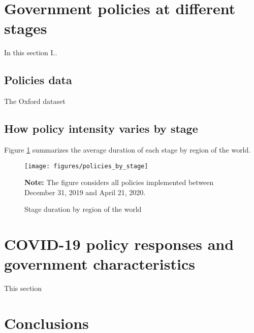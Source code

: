 \documentclass[12pt,english]{article}
\begin{document}

\section{Government policies at different stages \label{sec:Policies}}

In this section I..

\subsection{Policies data \label{subsec:Policies-data}}

The Oxford dataset

\subsection{How policy intensity varies by stage \label{subsec:Policies-by-stage}}

Figure \ref{fig:policies_by_stage} summarizes the average duration of each stage by region of the world.

\begin{figure}[H]
	\singlespacing
	\centering
	 \caption{Stage duration by region of the world}  \label{fig:policies_by_stage}
	\resizebox{0.7\width}{!} {
		\begin{threeparttable}

 			  \texttt{[image: figures/policies\_by\_stage]}
  			 \begin{tablenotes}[flushleft]\vspace*{-7bp}
			\item \textbf{Note:} The figure considers all policies implemented between December 31, 2019 and April 21, 2020.
			 \end{tablenotes}
  		\end{threeparttable}
 		}
  	 \onehalfspacing
\end{figure}



\section{COVID-19 policy responses and government characteristics \label{sec:Characteristics}}


This section


\section{Conclusions\label{sec:Conclusion}}
\end{document}
